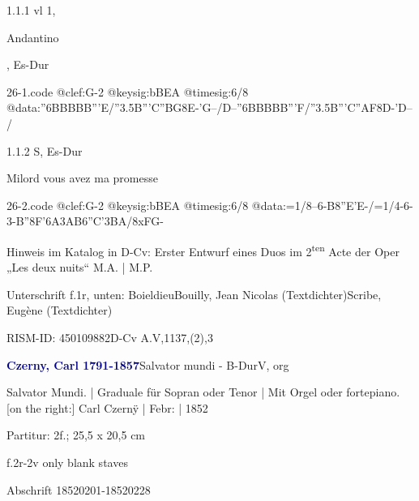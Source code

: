 \documentclass[a4paper, twocolumn, 11pt]{book}
\begin{document}
\par 1.1.1  vl 1, \begin{itshape}Andantino\end{itshape}, Es-Dur  
\begin{filecontents*}{26-1.code}
@clef:G-2
@keysig:bBEA
@timesig:6/8
@data:''{6BBBBB'''E}/''{3.5B'''C''BG}8E-'G--/D--''{6BBBBB'''F}/''{3.5B'''C''AF}8D-'D--/
\end{filecontents*}
\newline %
\par 1.1.2  S, Es-Dur\newline \begin{footnotesize} Milord vous avez ma promesse \end{footnotesize}  
\begin{filecontents*}{26-2.code}
@clef:G-2
@keysig:bBEA
@timesig:6/8
@data:=1/8--6-B{8''E'E}-/=1/4-6-3-B''{8F'6A}3AB6''C'3BA/8xFG-
\end{filecontents*}
\newline %
\par Hinweis im Katalog in D-Cv: Erster Entwurf eines Duos im 2\textsuperscript{t}\textsuperscript{e}\textsuperscript{n} Acte der Oper „Les deux nuits“ M.A. | M.P.
\par Unterschrift f.1r, unten: Boieldieu\newline Bouilly, Jean Nicolas  (Textdichter)\newline Scribe, Eugène  (Textdichter)
\par RISM-ID: 450109882\newline D-Cv  A.V,1137,(2),3
\par \vspace{16pt} \textcolor{darkblue}{\textbf{Czerny, Carl  1791-1857}}\hfillplus{[27]}\newline Salvator mundi - B-Dur\newline V, org
\par \begin{itshape} Salvator Mundi. | Graduale für Sopran oder Tenor | Mit Orgel oder fortepiano. [on the right:] Carl Czernÿ | Febr: | 1852\end{itshape} 
\par \textcolor{darkblue}{}  Partitur: 2f.; 25,5 x 20,5 cm\newline \begin{small} f.2r-2v only blank staves\end{small} \newline Abschrift  18520201-18520228
\end{document}
